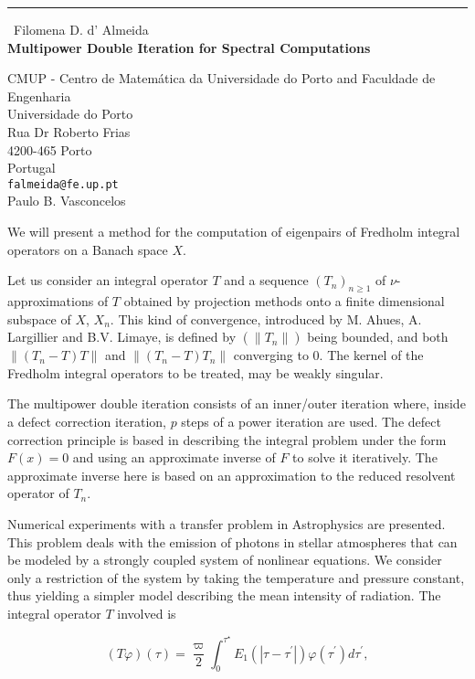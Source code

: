 \documentclass{report}
\begin{document}
\begin{center}
\rule{6in}{1pt} \
{\large Filomena D. d' Almeida \\
{\bf Multipower Double Iteration for Spectral Computations}}

CMUP - Centro de Matem\'{a}tica da Universidade do Porto and Faculdade de Engenharia \\ Universidade do Porto \\ Rua Dr Roberto Frias \\ 4200-465 Porto \\ Portugal
\\
{\tt falmeida@fe.up.pt}\\
Paulo B.  Vasconcelos\end{center}

We will present a method for the computation of eigenpairs of Fredholm
integral operators on a Banach space $X$.

Let us consider an integral operator $T$ and a sequence
$(T_n)_{n\geq1}$ of $\nu$-approximations of $T$ obtained by projection
methods onto a finite dimensional subspace of $X$, $X_n$.
This kind of convergence, introduced by M. Ahues, A. Largillier and B.V.
Limaye, is defined by
$(\left\| T_n \right\|)$
being bounded, and both $ \left\|(T_n - T)T \right\|$
and $\left\|(T_n - T)T_n \right\|$ converging to $0$.
The kernel of the Fredholm integral operators to be treated, may be weakly singular.

The multipower double iteration consists of an inner/outer iteration
where, inside a defect correction iteration, $p$ steps of a power
iteration are used.
The defect correction principle is based in describing the integral
problem under the form $F(x)=0$ and using an approximate inverse of $F$
to solve it iteratively.
The approximate inverse here is based on an approximation to the reduced
resolvent operator of $T_n$.


Numerical experiments with a transfer problem in Astrophysics are presented.
This problem deals with the emission of photons in stellar atmospheres that can be
modeled by a strongly coupled system of nonlinear equations.
We consider only a restriction of the system by taking the temperature
and pressure constant, thus yielding a simpler model describing the mean
intensity of radiation.
The integral operator $T$ involved is

$$
(T\varphi)(\tau)=\frac{\varpi}{2}\int_{0}^{\tau^{\star}}E_{1}\left(
\left\vert \tau-\tau^{\prime}\right\vert \right) \varphi\left( \tau^{\prime
}\right) d\tau^{\prime}, \label{fred_op}
$$
\end{document}
